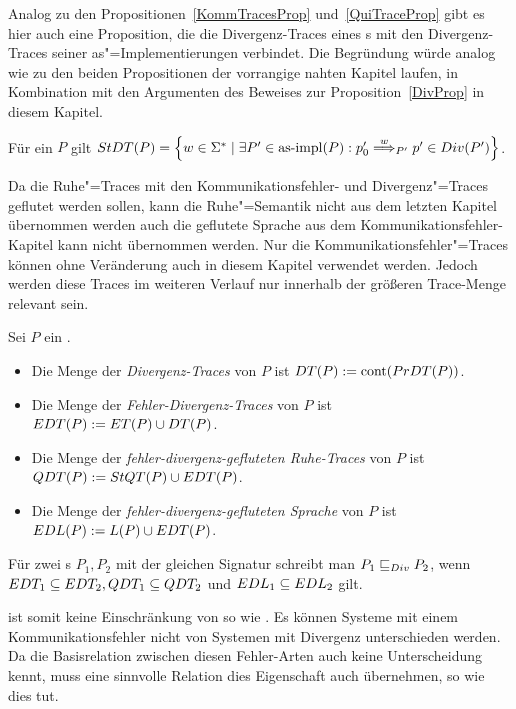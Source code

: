 Analog zu den Propositionen~\ref{KommTracesProp} und~\ref{QuiTraceProp} gibt es
hier auch eine Proposition, die die Divergenz-Traces eines \MEIO{}s mit den
Divergenz-Traces seiner as"=Implementierungen verbindet. Die Begründung würde
analog wie zu den beiden Propositionen der vorrangige nahten Kapitel laufen, in
Kombination mit den Argumenten des Beweises zur Proposition~\ref{DivProp} in
diesem Kapitel.

\begin{Prop}
  Für ein \MEIO{} $P$ gilt $\StDT (P) = \left\{w\in\Sigma ^*\mid \exists P' \in
  \asimp (P): p'_0\weakmust[w]_{P'} p'\in Div(P')\right\}$.
\end{Prop}

Da die Ruhe"=Traces mit den Kommunikationsfehler- und Divergenz"=Traces
geflutet werden sollen, kann die Ruhe"=Semantik nicht aus dem letzten Kapitel
übernommen werden auch die geflutete Sprache aus dem
Kommunikationsfehler-Kapitel kann nicht übernommen werden. Nur die
Kommunikationsfehler"=Traces \ET{} können ohne Veränderung auch in diesem
Kapitel verwendet werden. Jedoch werden diese Traces im weiteren Verlauf nur
innerhalb der größeren Trace-Menge \EDT{} relevant sein.

\begin{Def}
  Sei $P$ ein \MEIO{}.
  \begin{itemize}
    \item Die Menge der \emph{Divergenz-Traces} von $P$ ist $DT (P) := \mathrm{cont}
      (PrDT (P))$.
    \item Die Menge der \emph{Fehler-Divergenz-Traces} von $P$ ist $EDT (P) :=
      ET (P)\cup DT (P)$.
    \item Die Menge der \emph{fehler-divergenz-gefluteten Ruhe-Traces} von $P$
      ist $QDT (P) := StQT (P)\cup EDT (P)$.
    \item Die Menge der \emph{fehler-divergenz-gefluteten Sprache} von $P$ ist
      $EDL (P) := L(P)\cup EDT (P)$.
  \end{itemize}
  Für zwei \MEIO{}s $P_1,P_2$ mit der gleichen Signatur schreibt man $P_1 \sqsubseteq  _{Div}
  P_2$, wenn $EDT _1\subseteq EDT _2, QDT _1\subseteq QDT _2$ und $EDL
  _1\subseteq EDL _2$ gilt.
\end{Def}

\DRel{} ist somit keine Einschränkung von \ERel{} so wie \QRel{}. Es können
Systeme mit einem Kommunikationsfehler nicht von Systemen mit Divergenz
unterschieden werden. Da die Basisrelation zwischen diesen Fehler-Arten auch
keine Unterscheidung kennt, muss eine sinnvolle Relation dies Eigenschaft auch
übernehmen, so wie \DRel{} dies tut.

